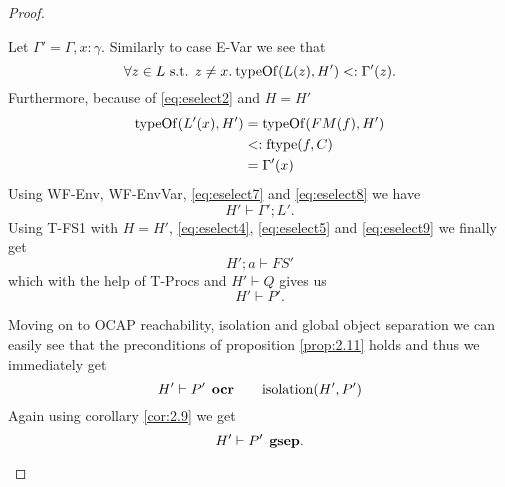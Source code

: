 \begin{proof}
\begin{description}
\begin{description}
\begin{description}
\begin{equation}
              \end{equation}
              Let $\Gamma' = \Gamma, x: \gamma$. Similarly to case {\sc E-Var}
              we see that
              \begin{equation} \label{eq:eselect7}
                \forall z \in L \text{ s.t. } z \neq x . \: \mbox{$\mathrm{typeOf}$}(L(z), H')
                <: \Gamma'(z).
              \end{equation}
              Furthermore, because of \eqref{eq:eselect2} and $H = H'$
              \begin{equation} \label{eq:eselect8}
                \begin{aligned}
                  \mbox{$\mathrm{typeOf}$}(L'(x), H') &= \mbox{$\mathrm{typeOf}$}(FM(f), H') \\
                                     &<: \mbox{$\mathrm{ftype}$}(f, C) \\
                                     &= \Gamma'(x)
                \end{aligned}
              \end{equation}
              Using {\sc WF-Env, WF-EnvVar}, \eqref{eq:eselect7} and
              \eqref{eq:eselect8} we have
              \begin{equation} \label{eq:eselect9}
                H' \vdash \Gamma';L'.
              \end{equation}
              Using {\sc T-FS1} with $H = H'$, \eqref{eq:eselect4}, \eqref{eq:eselect5}
              and \eqref{eq:eselect9} we finally get
              \begin{equation}
                H';a \vdash FS'
              \end{equation}
              which with the help of {\sc T-Procs} and $H' \vdash Q$ gives us 
              \begin{equation*}
                H'\vdash P'.
              \end{equation*}
              
              Moving on to OCAP reachability, isolation and global object
              separation we can easily see that the preconditions of proposition
              \ref{prop:2.11} holds and thus we immediately get
              \begin{equation*}
                H' \vdash P' \:\: \mbox{\bf ocr} \quad\quad \mbox{$\mathrm{isolation}$}(H', P')
              \end{equation*}
              Again using corollary \ref{cor:2.9} we get
              \begin{equation*}
                H' \vdash P' \:\: \mbox{\bf gsep}.
              \end{equation*}



\end{description}
\end{description}
\end{description}
\end{proof}
